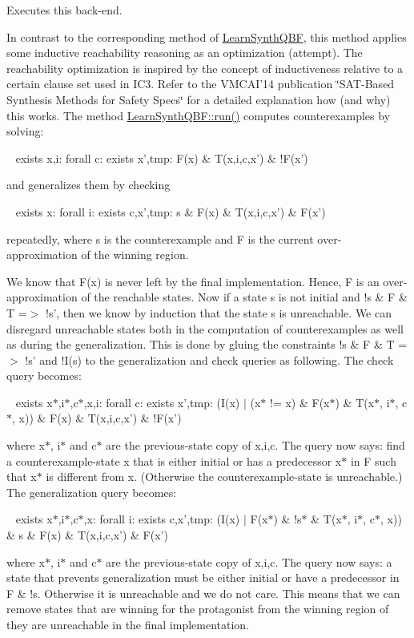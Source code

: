 Executes this back-\/end. 

In contrast to the corresponding method of \hyperlink{classLearnSynthQBF}{Learn\-Synth\-Q\-B\-F}, this method applies some inductive reachability reasoning as an optimization (attempt). The reachability optimization is inspired by the concept of inductiveness relative to a certain clause set used in I\-C3. Refer to the V\-M\-C\-A\-I'14 publication \char`\"{}\-S\-A\-T-\/\-Based Synthesis Methods for Safety
\-Specs\char`\"{} for a detailed explanation how (and why) this works. The method \hyperlink{classLearnSynthQBF_aed85bb2fe317a5fdc7eef71fe598c606}{Learn\-Synth\-Q\-B\-F\-::run()} computes counterexamples by solving\-: \par
 ~ exists x,i\-: forall c\-: exists x',tmp\-: F(x) \& T(x,i,c,x') \& !\-F(x') \par
 and generalizes them by checking \par
 ~ exists x\-: forall i\-: exists c,x',tmp\-: s \& F(x) \& T(x,i,c,x') \& F(x') \par
 repeatedly, where s is the counterexample and F is the current over-\/approximation of the winning region.

We know that F(x) is never left by the final implementation. Hence, F is an over-\/approximation of the reachable states. Now if a state s is not initial and !s \& F \& T =$>$ !s', then we know by induction that the state s is unreachable. We can disregard unreachable states both in the computation of counterexamples as well as during the generalization. This is done by gluing the constraints !s \& F \& T =$>$ !s' and !\-I(s) to the generalization and check queries as following. The check query becomes\-: \par
 ~ exists x$\ast$,i$\ast$,c$\ast$,x,i\-: forall c\-: exists x',tmp\-: (I(x) $\vert$ (x$\ast$ != x) \& F(x$\ast$) \& T(x$\ast$, i$\ast$, c$\ast$, x)) \& F(x) \& T(x,i,c,x') \& !\-F(x') \par
 where x$\ast$, i$\ast$ and c$\ast$ are the previous-\/state copy of x,i,c. The query now says\-: find a counterexample-\/state x that is either initial or has a predecessor x$\ast$ in F such that x$\ast$ is different from x. (Otherwise the counterexample-\/state is unreachable.) The generalization query becomes\-: \par
 ~ exists x$\ast$,i$\ast$,c$\ast$,x\-: forall i\-: exists c,x',tmp\-: (I(x) $\vert$ F(x$\ast$) \& !s$\ast$ \& T(x$\ast$, i$\ast$, c$\ast$, x)) \& s \& F(x) \& T(x,i,c,x') \& F(x') \par
 where x$\ast$, i$\ast$ and c$\ast$ are the previous-\/state copy of x,i,c. The query now says\-: a state that prevents generalization must be either initial or have a predecessor in F \& !s. Otherwise it is unreachable and we do not care. This means that we can remove states that are winning for the protagonist from the winning region of they are unreachable in the final implementation.

